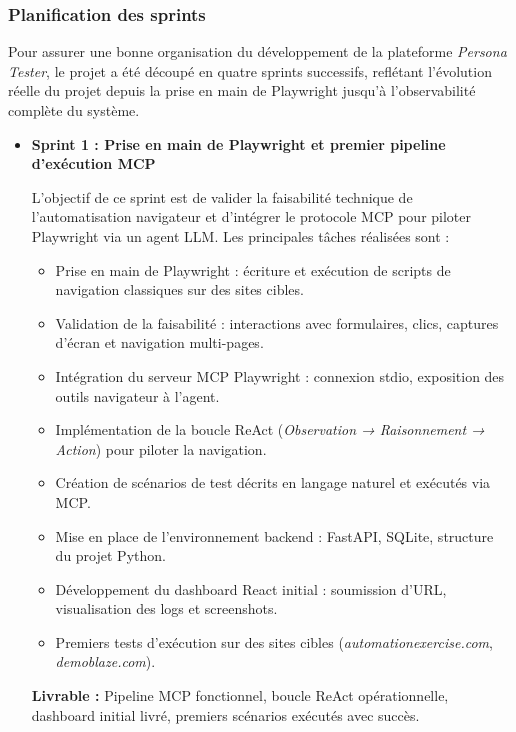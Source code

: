 \subsubsection{Planification des sprints}

Pour assurer une bonne organisation du développement de la plateforme 
\textit{Persona Tester}, le projet a été découpé en quatre sprints 
successifs, reflétant l'évolution réelle du projet depuis la prise en 
main de Playwright jusqu'à l'observabilité complète du système.

\begin{itemize}

\item \textbf{Sprint 1 : Prise en main de Playwright et premier 
pipeline d'exécution MCP}

L'objectif de ce sprint est de valider la faisabilité technique de 
l'automatisation navigateur et d'intégrer le protocole MCP pour 
piloter Playwright via un agent LLM. Les principales tâches 
réalisées sont :

\begin{itemize}
    \item Prise en main de Playwright : écriture et exécution de 
    scripts de navigation classiques sur des sites cibles.
    \item Validation de la faisabilité : interactions avec formulaires, 
    clics, captures d'écran et navigation multi-pages.
    \item Intégration du serveur MCP Playwright : connexion stdio, 
    exposition des outils navigateur à l'agent.
    \item Implémentation de la boucle ReAct (\textit{Observation → 
    Raisonnement → Action}) pour piloter la navigation.
    \item Création de scénarios de test décrits en langage naturel 
    et exécutés via MCP.
    \item Mise en place de l'environnement backend : FastAPI, SQLite, 
    structure du projet Python.
    \item Développement du dashboard React initial : soumission d'URL, 
    visualisation des logs et screenshots.
    \item Premiers tests d'exécution sur des sites cibles 
    (\textit{automationexercise.com}, \textit{demoblaze.com}).
\end{itemize}

\textbf{Livrable :} Pipeline MCP fonctionnel, boucle ReAct opérationnelle, 
dashboard initial livré, premiers scénarios exécutés avec succès.


\end{itemize}
